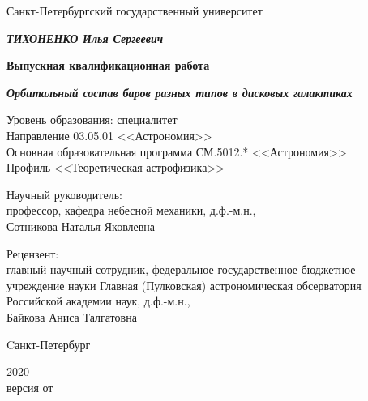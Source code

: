 \begin{titlepage}
  \centering
  {Санкт-Петербургский государственный университет \par}
  
  \vspace{2cm}

  {\bfseries \itshape\MakeUppercase{Тихоненко} Илья Сергеевич\par}
  \vspace{0.5\baselineskip}
  {\bfseries Выпускная квалификационная работа\par}
  \vspace{0.5\baselineskip}
  {\bfseries \itshape Орбитальный состав баров разных типов в дисковых галактиках\par}
  \vspace{2cm}
  {
    \begin{spacing}{1.0}
    Уровень образования: специалитет\\
    Направление 03.05.01 <<Астрономия>>\\
    Основная образовательная программа СМ.5012.* <<Астрономия>>\\
    Профиль <<Теоретическая астрофизика>>
    \end{spacing}
  }
  \vspace{1cm}
  \begin{flushright}
    \singlespacing
    \parbox{0.5\textwidth}{
      {Научный руководитель:} \\
      профессор, кафедра небесной механики, д.ф.-м.н.,\\
      Сотникова Наталья Яковлевна
    }
  \end{flushright}
  \par
  \begin{flushright}
    \singlespacing
    \parbox{0.5\textwidth}{
    {Рецензент:} \\
      главный научный сотрудник,
      федеральное государственное бюджетное учреждение науки Главная (Пулковская) 
      астрономическая обсерватория Российской академии наук,
      д.ф.-м.н.,\\
      Байкова Аниса Талгатовна
    }
  \end{flushright}
  
  \vfill
  
  {Cанкт-Петербург \par}
  {2020}\\
  {\small версия от }
  \vspace*{-\baselineskip}
\end{titlepage}
